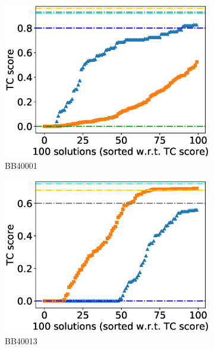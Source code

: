 \begin{figure}[!htbp]
	\centering
	\begin{adjustwidth}{-1cm}{-1cm}
		\begin{subfigure}{0.22\textwidth}
			\includegraphics[width=\columnwidth]{Figure/summary/precomputedInit/Balibase/BB40001_tc_density_single_run_2}
			\caption{BB40001}
		\end{subfigure}	
		\begin{subfigure}{0.22\textwidth}
			\includegraphics[width=\columnwidth]{Figure/summary/precomputedInit/Balibase/BB40013_tc_density_single_run_2}
			\caption{BB40013}
		\end{subfigure}
		\begin{subfigure}{0.22\textwidth}

\end{subfigure}
\end{adjustwidth}
\end{figure}
